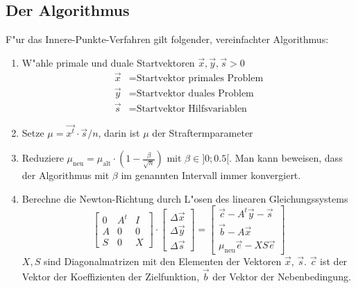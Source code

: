 \begin{refsection}
\section{Der Algorithmus}
F"ur das Innere-Punkte-Verfahren gilt folgender, vereinfachter Algorithmus:

\begin{enumerate}
\item W"ahle primale und duale Startvektoren $\vec{x},\vec{y},\vec{s} > 0$\\
\begin{align*}
\vec{x}&= \text{Startvektor primales Problem}
\\
\vec{y}&=  \text{Startvektor duales Problem}
\\
\vec{s}&= \text{Startvektor Hilfsvariablen}
\end{align*}
\item Setze $\mu = \vec{x^t} \cdot \vec{s}/n$, darin ist
$\mu$ der Straftermparameter
\item Reduziere $\mu_{\text{neu}}=\mu_{\text{alt}} \cdot (1-\frac{\beta}{\sqrt{n}})$ mit $\beta \in ]0;0.5[$.
Man kann beweisen, dass der Algorithmus mit $\beta$ im genannten Intervall
immer konvergiert.
\item Berechne die Newton-Richtung durch L"osen des linearen Gleichungssystems
\[
\begin{bmatrix}
0 & A^t & I \\
A & 0 & 0 \\
S & 0 & X
\end{bmatrix}
\cdot 
\begin{bmatrix}
\Delta\vec{x}\\
\Delta \vec{y}\\
\Delta \vec{s} \end{bmatrix}
 =                                                     
\begin{bmatrix}
\vec{c} - A^t \vec{y} - \vec{s} \\
\vec{b}-A\vec{x} \\
\mu_{\text{neu}}\vec{e}-XS\vec{e}
\end{bmatrix}
\]
$X,S$ sind Diagonalmatrizen mit den Elementen der Vektoren $\vec{x}$,
$\vec{s}$.
$\vec{c}$ ist der Vektor der Koeffizienten der Zielfunktion,
$\vec{b}$ der Vektor der Nebenbedingung.


\end{enumerate}
\end{refsection}
